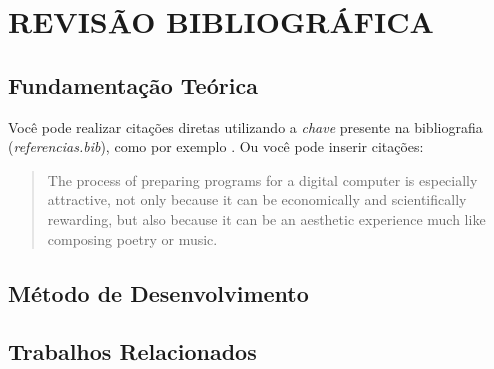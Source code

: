 \chapter{REVISÃO BIBLIOGRÁFICA}\par
\lipsum[1]
\section{Fundamentação Teórica}
Você pode realizar citações diretas utilizando a \emph{chave} presente na bibliografia (\emph{referencias.bib}), como por exemplo \cite{turing}. Ou você pode inserir citações:

\begin{quote}
    The process of preparing programs for a digital computer is especially attractive, not only because it can be economically and scientifically rewarding, but also because it can be an aesthetic experience much like composing poetry or music.
    
\end{quote}

\section{Método de Desenvolvimento}
\lipsum[1]
\section{Trabalhos Relacionados}
\lipsum[1]